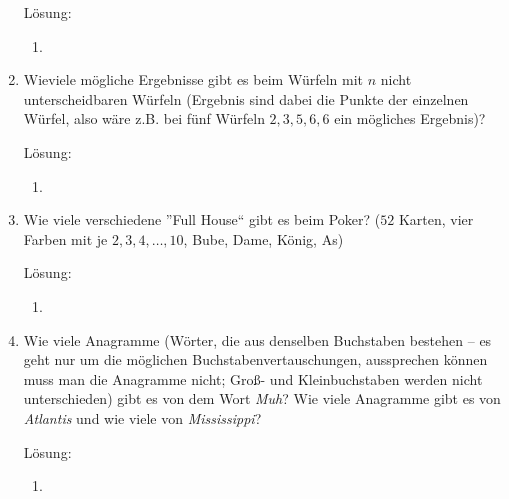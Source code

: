 \documentclass[main.tex]{subfiles}
\begin{document}
\begin{enumerate}
	      Lösung:
	      \begin{enumerate}
		      \item
	      \end{enumerate}
	\item Wieviele mögliche Ergebnisse gibt es beim Würfeln mit \( n \) nicht unterscheidbaren
	      Würfeln (Ergebnis sind dabei die Punkte der einzelnen Würfel,
	      also wäre z.B. bei fünf Würfeln \( 2,3,5,6,6 \) ein mögliches Ergebnis)?

	      Lösung:
	      \begin{enumerate}
		      \item
	      \end{enumerate}
	\item Wie viele verschiedene ”Full House“ gibt es beim Poker?
	      (\( 52 \) Karten, vier Farben mit je \( 2,3,4, \dots, 10 \), Bube, Dame, König, As)

	      Lösung:
	      \begin{enumerate}
		      \item
	      \end{enumerate}
	\item Wie viele Anagramme (Wörter, die aus denselben Buchstaben bestehen – es
	      geht nur um die möglichen Buchstabenvertauschungen, aussprechen können
	      muss man die Anagramme nicht; Groß- und Kleinbuchstaben werden nicht
	      unterschieden) gibt es von dem Wort \textit{Muh}? Wie viele Anagramme gibt es
	      von \textit{Atlantis} und wie viele von \textit{Mississippi}?

	      Lösung:
	      \begin{enumerate}
		      \item
	      \end{enumerate}
\end{enumerate}
\end{document}
